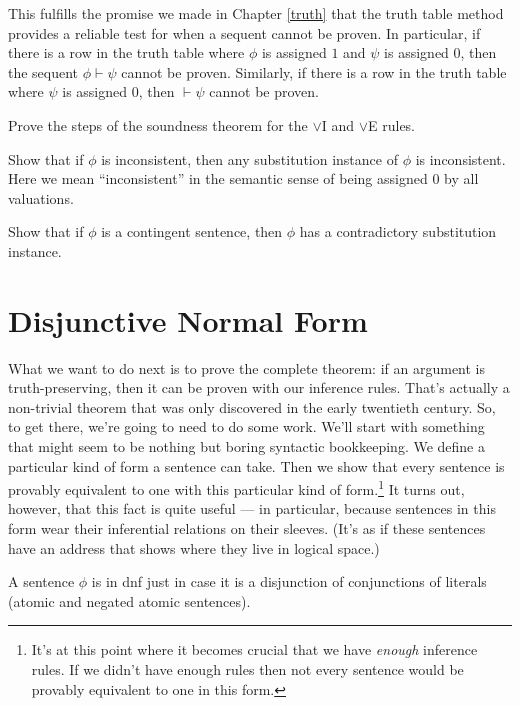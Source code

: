 This fulfills the promise we made in Chapter \ref{truth} that the
truth table method provides a reliable test for when a sequent cannot
be proven.  In particular, if there is a row in the truth table where
$\phi$ is assigned $1$ and $\psi$ is assigned $0$, then the sequent
$\phi\vdash\psi$ cannot be proven.  Similarly, if there is a row in
the truth table where $\psi$ is assigned $0$, then $\vdash\psi$ cannot
be proven.

\begin{exercise} Prove the steps of the soundness theorem for the
  $\vee$I and $\vee$E rules. \end{exercise}
\begin{exercise} Show that if $\phi$ is inconsistent, then any
  substitution instance of $\phi$ is inconsistent.  Here we mean
  ``inconsistent'' in the semantic sense of being assigned $0$ by all
  valuations. \end{exercise}
\begin{exercise} Show that if $\phi$ is a contingent sentence, then $\phi$ has a
  contradictory substitution instance. \end{exercise}


\section{Disjunctive Normal Form}

What we want to do next is to prove the \gls{complete} theorem: if an
argument is truth-preserving, then it can be proven with our inference
rules.  That's actually a non-trivial theorem that was only discovered
in the early twentieth century.  So, to get there, we're going to need
to do some work.  We'll start with something that might seem to be
nothing but boring syntactic bookkeeping.  We define a particular kind
of form a sentence can take.  Then we show that every sentence is
provably equivalent to one with this particular kind of
form.\footnote{It's at this point where it becomes crucial that we
  have {\it enough} inference rules.  If we didn't have enough rules
  then not every sentence would be provably equivalent to one in this
  form.}  It turns out, however, that this fact is quite useful --- in
particular, because sentences in this form wear their inferential
relations on their sleeves.  (It's as if these sentences have an
address that shows where they live in logical space.)

\begin{defn} A sentence $\phi$ is in \gls{dnf} just in case it is a disjunction of
conjunctions of literals (atomic and negated atomic
sentences). \end{defn}

